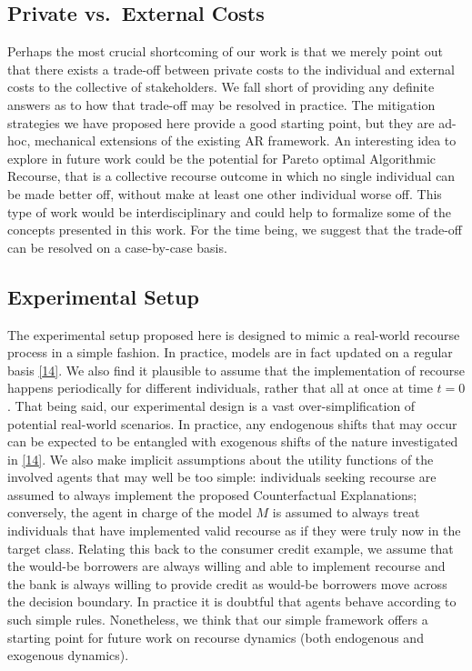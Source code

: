 \documentclass[
  conference]{IEEEtran}
\begin{document}
\hypertarget{private-vs.-external-costs}{%
\subsection{Private vs.~External
Costs}\label{private-vs.-external-costs}}

Perhaps the most crucial shortcoming of our work is that we merely point
out that there exists a trade-off between private costs to the
individual and external costs to the collective of stakeholders. We fall
short of providing any definite answers as to how that trade-off may be
resolved in practice. The mitigation strategies we have proposed here
provide a good starting point, but they are ad-hoc, mechanical
extensions of the existing AR framework. An interesting idea to explore
in future work could be the potential for Pareto optimal Algorithmic
Recourse, that is a collective recourse outcome in which no single
individual can be made better off, without make at least one other
individual worse off. This type of work would be interdisciplinary and
could help to formalize some of the concepts presented in this work. For
the time being, we suggest that the trade-off can be resolved on a
case-by-case basis.

\hypertarget{experimental-setup}{%
\subsection{Experimental Setup}\label{experimental-setup}}

The experimental setup proposed here is designed to mimic a real-world
recourse process in a simple fashion. In practice, models are in fact
updated on a regular basis
\protect\hyperlink{ref-upadhyay2021towards}{{[}14{]}}. We also find it
plausible to assume that the implementation of recourse happens
periodically for different individuals, rather that all at once at time
\(t=0\). That being said, our experimental design is a vast
over-simplification of potential real-world scenarios. In practice, any
endogenous shifts that may occur can be expected to be entangled with
exogenous shifts of the nature investigated in
\protect\hyperlink{ref-upadhyay2021towards}{{[}14{]}}. We also make
implicit assumptions about the utility functions of the involved agents
that may well be too simple: individuals seeking recourse are assumed to
always implement the proposed Counterfactual Explanations; conversely,
the agent in charge of the model \(M\) is assumed to always treat
individuals that have implemented valid recourse as if they were truly
now in the target class. Relating this back to the consumer credit
example, we assume that the would-be borrowers are always willing and
able to implement recourse and the bank is always willing to provide
credit as would-be borrowers move across the decision boundary. In
practice it is doubtful that agents behave according to such simple
rules. Nonetheless, we think that our simple framework offers a starting
point for future work on recourse dynamics (both endogenous and
exogenous dynamics).
\end{document}
